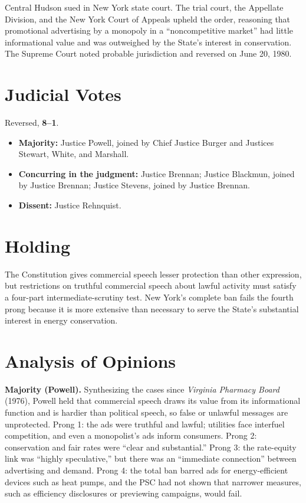 \documentclass[12pt]{article}
\begin{document}
Central Hudson sued in New York state court. The trial court, the Appellate Division, and the New York Court of Appeals upheld the order, reasoning that promotional advertising by a monopoly in a ``noncompetitive market'' had little informational value and was outweighed by the State's interest in conservation. The Supreme Court noted probable jurisdiction and reversed on June 20, 1980.

\section{Judicial Votes}

Reversed, \textbf{8--1}.
\begin{itemize}
\item \textbf{Majority:} Justice Powell, joined by Chief Justice Burger and Justices Stewart, White, and Marshall.
\item \textbf{Concurring in the judgment:} Justice Brennan; Justice Blackmun, joined by Justice Brennan; Justice Stevens, joined by Justice Brennan.
\item \textbf{Dissent:} Justice Rehnquist.
\end{itemize}

\section{Holding}

The Constitution gives commercial speech lesser protection than other expression, but restrictions on truthful commercial speech about lawful activity must satisfy a four-part intermediate-scrutiny test. New York's complete ban fails the fourth prong because it is more extensive than necessary to serve the State's substantial interest in energy conservation.

\section{Analysis of Opinions}

\textbf{Majority (Powell).} Synthesizing the cases since \textit{Virginia Pharmacy Board} (1976), Powell held that commercial speech draws its value from its informational function and is hardier than political speech, so false or unlawful messages are unprotected. Prong 1: the ads were truthful and lawful; utilities face interfuel competition, and even a monopolist's ads inform consumers. Prong 2: conservation and fair rates were ``clear and substantial.'' Prong 3: the rate-equity link was ``highly speculative,'' but there was an ``immediate connection'' between advertising and demand. Prong 4: the total ban barred ads for energy-efficient devices such as heat pumps, and the PSC had not shown that narrower measures, such as efficiency disclosures or previewing campaigns, would fail.
\end{document}
